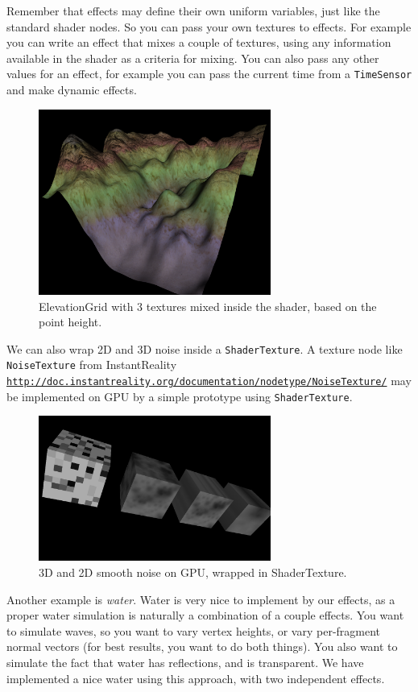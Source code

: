 \documentclass{acmsiggraph}                     %
\newcommand*{\myhref}[2]{\texttt{\href{#1}{\nolinkurl{#2}}}}
\begin{document}
Remember that effects may define their own uniform variables,
just like the standard shader nodes. So you can pass your own textures
to effects. For example you can write an effect that mixes a couple of textures,
using any information available in the shader as a criteria for mixing.
You can also pass any other values for an effect, for example you can
pass the current time from a \texttt{TimeSensor} and make dynamic effects.

\begin{figure}[H]
  \centering
  \includegraphics[width=3in]{terrain}
  \caption{ElevationGrid with 3 textures mixed inside the shader,
based on the point height.}
\end{figure}

We can also wrap 2D and 3D noise inside a \texttt{ShaderTexture}.
A texture node like \texttt{NoiseTexture} from InstantReality
\myhref{http://doc.instantreality.org/documentation/nodetype/NoiseTexture/}{http://doc.instantreality.org/documentation/nodetype/NoiseTexture/}
may be implemented on GPU by a simple prototype using \texttt{ShaderTexture}.

\begin{figure}[H]
  \centering
  \includegraphics[width=3in]{noise}
  \caption{3D and 2D smooth noise on GPU, wrapped in ShaderTexture.}
\end{figure}

Another example is \emph{water}. Water is very nice to implement by our effects,
as a proper water simulation
is naturally a combination of a couple effects.
You want to simulate waves, so you want to vary vertex
heights, or vary per-fragment normal vectors (for best results,
you want to do both things).
You also want to simulate the fact that water has reflections, and
is transparent. We have implemented a nice water using this approach,
with two independent effects.
\end{document}
